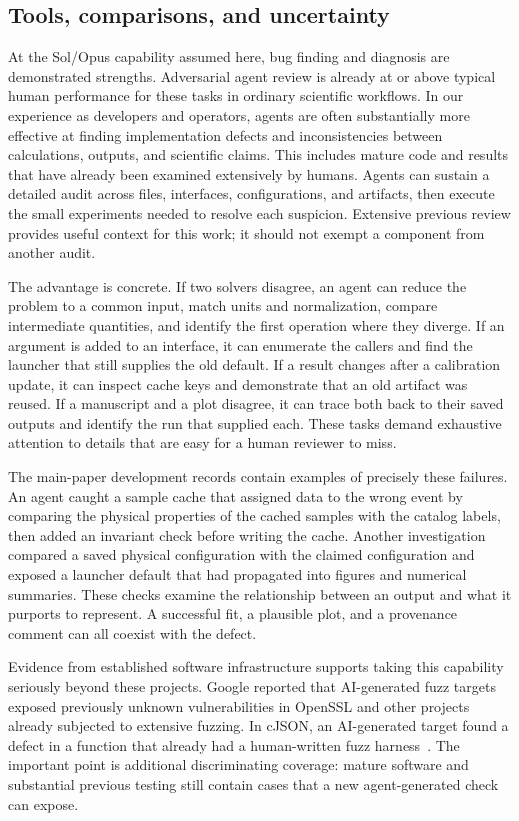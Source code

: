 \documentclass[aps,prd,reprint,nofootinbib]{revtex4-2}
\begin{document}
\subsection{Tools, comparisons, and uncertainty}
At the Sol/Opus capability assumed here, bug finding and diagnosis are demonstrated strengths. Adversarial agent review is already at or above typical human performance for these tasks in ordinary scientific workflows. In our experience as developers and operators, agents are often substantially more effective at finding implementation defects and inconsistencies between calculations, outputs, and scientific claims. This includes mature code and results that have already been examined extensively by humans. Agents can sustain a detailed audit across files, interfaces, configurations, and artifacts, then execute the small experiments needed to resolve each suspicion. Extensive previous review provides useful context for this work; it should not exempt a component from another audit.

The advantage is concrete. If two solvers disagree, an agent can reduce the problem to a common input, match units and normalization, compare intermediate quantities, and identify the first operation where they diverge. If an argument is added to an interface, it can enumerate the callers and find the launcher that still supplies the old default. If a result changes after a calibration update, it can inspect cache keys and demonstrate that an old artifact was reused. If a manuscript and a plot disagree, it can trace both back to their saved outputs and identify the run that supplied each. These tasks demand exhaustive attention to details that are easy for a human reviewer to miss.

The main-paper development records contain examples of precisely these failures. An agent caught a sample cache that assigned data to the wrong event by comparing the physical properties of the cached samples with the catalog labels, then added an invariant check before writing the cache. Another investigation compared a saved physical configuration with the claimed configuration and exposed a launcher default that had propagated into figures and numerical summaries. These checks examine the relationship between an output and what it purports to represent. A successful fit, a plausible plot, and a provenance comment can all coexist with the defect.

Evidence from established software infrastructure supports taking this capability seriously beyond these projects. Google reported that AI-generated fuzz targets exposed previously unknown vulnerabilities in OpenSSL and other projects already subjected to extensive fuzzing. In cJSON, an AI-generated target found a defect in a function that already had a human-written fuzz harness~\cite{AIFuzzing}. The important point is additional discriminating coverage: mature software and substantial previous testing still contain cases that a new agent-generated check can expose.
\end{document}
